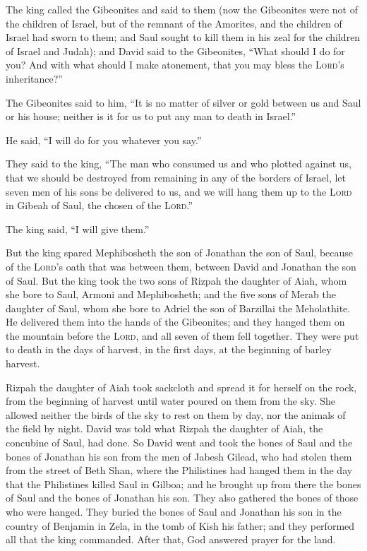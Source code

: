  The king called the Gibeonites and said to them (now the
Gibeonites were not of the children of Israel, but of the remnant of the
Amorites, and the children of Israel had sworn to them; and Saul sought
to kill them in his zeal for the children of Israel and Judah);
 and David said to the Gibeonites, ``What should I do for
you? And with what should I make atonement, that you may bless the
\textsc{Lord}'s inheritance?''

 The Gibeonites said to him, ``It is no matter of silver
or gold between us and Saul or his house; neither is it for us to put
any man to death in Israel.''

He said, ``I will do for you whatever you say.''

 They said to the king, ``The man who consumed us and who
plotted against us, that we should be destroyed from remaining in any of
the borders of Israel,  let seven men of his sons be
delivered to us, and we will hang them up to the \textsc{Lord} in Gibeah
of Saul, the chosen of the \textsc{Lord}.''

The king said, ``I will give them.''

 But the king spared Mephibosheth the son of Jonathan the
son of Saul, because of the \textsc{Lord}'s oath that was between them,
between David and Jonathan the son of Saul.  But the king
took the two sons of Rizpah the daughter of Aiah, whom she bore to Saul,
Armoni and Mephibosheth; and the five sons of Merab the daughter of
Saul, whom she bore to Adriel the son of Barzillai the Meholathite.
 He delivered them into the hands of the Gibeonites; and
they hanged them on the mountain before the \textsc{Lord}, and all seven
of them fell together. They were put to death in the days of harvest, in
the first days, at the beginning of barley harvest.

 Rizpah the daughter of Aiah took sackcloth and spread it
for herself on the rock, from the beginning of harvest until water
poured on them from the sky. She allowed neither the birds of the sky to
rest on them by day, nor the animals of the field by night.
 David was told what Rizpah the daughter of Aiah, the
concubine of Saul, had done.  So David went and took the
bones of Saul and the bones of Jonathan his son from the men of Jabesh
Gilead, who had stolen them from the street of Beth Shan, where the
Philistines had hanged them in the day that the Philistines killed Saul
in Gilboa;  and he brought up from there the bones of
Saul and the bones of Jonathan his son. They also gathered the bones of
those who were hanged.  They buried the bones of Saul and
Jonathan his son in the country of Benjamin in Zela, in the tomb of Kish
his father; and they performed all that the king commanded. After that,
God answered prayer for the land.

